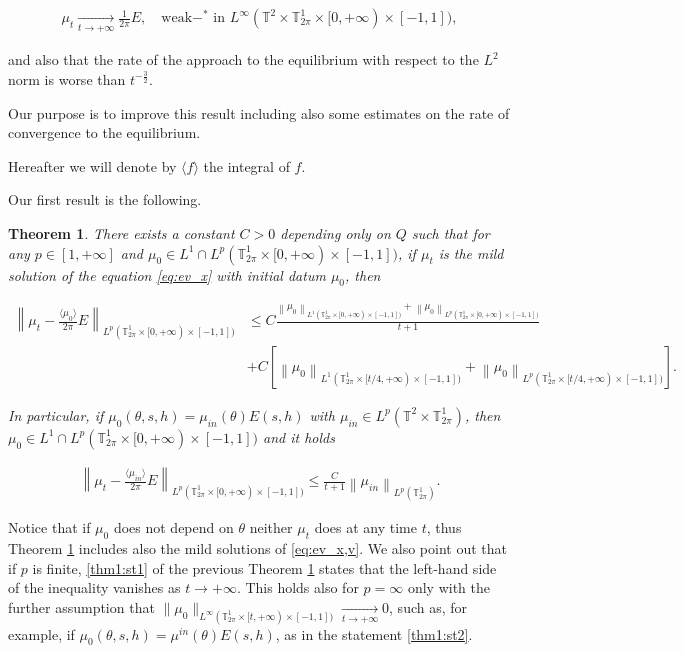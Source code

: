 \documentclass[a4paper,10pt,reqno]{amsart}
\newtheorem{theorem}{Theorem}[section]
\numberwithin{equation}{subsection}
\numberwithin{figure}{subsection}
\begin{document}
\begin{align}\label{convergenza*debole}
\mu_t\xrightarrow[t\to+\infty]{}\frac{1}{2\pi}E,\quad\textrm{weak}-^*\textrm{ in }L^{\infty}(\mathbb{T}^2\times\mathbb{T}^1_{2\pi}\times[0,+\infty)\times[-1,1]),
\end{align}

and also that the rate of the approach to the equilibrium with respect to the $L^2$ norm is worse than $t^{-\frac{3}{2}}$.

Our purpose is to improve this result including also some estimates on the rate of convergence to the equilibrium.

Hereafter we will denote by $\langle f\rangle$ the integral of $f$.

Our first result is the following.
\begin{theorem}\label{thm:convergenza_v,s,h}
There exists a constant $C>0$ depending only on $Q$ such that for any $p\in[1,+\infty]$ and  $\mu_0\in L^1\cap L^p(\mathbb{T}^1_{2\pi}\times[0,+\infty)\times[-1,1])$, if $\mu_t$ is the mild solution of the equation \eqref{eq:ev_x} with initial datum $\mu_0$, then

{\tiny\begin{align}
\nonumber\left\|\mu_t-\frac{\langle\mu_0\rangle}{2\pi}E\right\|_{L^p(\mathbb{T}^1_{2\pi}\times[0,+\infty)\times[-1,1])}&\leq C\frac{\left\|\mu_0\right\|_{L^1(\mathbb{T}^1_{2\pi}\times[0,+\infty)\times[-1,1])}+\left\|\mu_0\right\|_{L^p(\mathbb{T}^1_{2\pi}\times[0,+\infty)\times[-1,1])}}{t+1}
\\
\label{thm1:st1}&+C\left[\left\|\mu_0\right\|_{L^1(\mathbb{T}^1_{2\pi}\times[t/4,+\infty)\times[-1,1])}+\left\|\mu_0\right\|_{L^p(\mathbb{T}^1_{2\pi}\times[t/4,+\infty)\times[-1,1])}\right].
\end{align}}

In particular, if $\mu_0(\theta,s,h)=\mu_{in}(\theta)E(s,h)$ with $\mu_{in}\in L^p(\mathbb{T}^2\times\mathbb{T}^1_{2\pi})$, then $\mu_0\in L^1\cap L^p(\mathbb{T}^1_{2\pi}\times[0,+\infty)\times[-1,1])$ and it holds 

\begin{align}\label{thm1:st2}
\left\|\mu_t-\frac{\langle\mu_{in}\rangle}{2\pi}E\right\|_{L^p(\mathbb{T}^1_{2\pi}\times[0,+\infty)\times[-1,1])}\leq\frac{C}{t+1}\left\|\mu_{in}\right\|_{L^p(\mathbb{T}^1_{2\pi})}.
\end{align}

\end{theorem}
Notice that if $\mu_0$ does not depend on $\theta$ neither $\mu_t$ does at any time $t$, thus Theorem \ref{thm:convergenza_v,s,h} includes also the mild solutions of \eqref{eq:ev_x,v}. We also point out that if $p$ is finite, \eqref{thm1:st1} of the previous Theorem \ref{thm:convergenza_v,s,h} states that the left-hand side of the inequality vanishes as $t\to+\infty$. This holds also for $p=\infty$ only with the further assumption that $\|\mu_0\|_{L^{\infty}(\mathbb{T}^1_{2\pi}\times[t,+\infty)\times[-1,1])}\xrightarrow[t\to+\infty]{}0$, such as, for example, if $\mu_0(\theta,s,h)=\mu^{in}(\theta)E(s,h)$, as in the statement \eqref{thm1:st2}.
\end{document}
